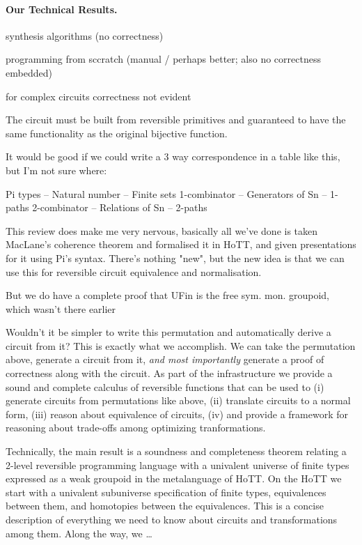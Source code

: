 \paragraph*{Our Technical Results.}



synthesis algorithms (no correctness)

programming from sccratch (manual / perhaps better; also no correctness embedded)

for complex circuits correctness not evident


The circuit must be built from reversible primitives and guaranteed to have the same functionality as the original bijective function.

It would be good if we could write a 3 way correspondence in a table like this, but I'm not sure where:

Pi types -- Natural number -- Finite sets
1-combinator -- Generators of Sn -- 1-paths
2-combinator -- Relations of Sn -- 2-paths

This review does make me very nervous, basically all we've done is taken MacLane's coherence theorem and formalised it in HoTT, and given presentations for it using Pi's syntax. There's nothing "new", but the new idea is that we can use this for reversible circuit equivalence and normalisation.

But we do have a complete proof that UFin is the free sym. mon. groupoid, which wasn't there earlier

Wouldn't it be simpler to write this permutation and automatically derive a circuit from it? This is exactly what we accomplish. We can take the permutation above, generate a circuit from it, \emph{and most importantly} generate a proof of correctness along with the circuit. As part of the infrastructure we provide a sound and complete calculus of reversible functions that can be used to (i) generate circuits from permutations like above, (ii) translate circuits to a normal form, (iii) reason about equivalence of circuits, (iv) and provide a framework for reasoning about trade-offs among optimizing tranformations.

Technically, the main result is a soundness and completeness theorem relating a 2-level reversible programming language with a univalent universe of finite types expressed as a weak groupoid in the metalanguage of HoTT. On the HoTT we start with a univalent subuniverse specification of finite types, equivalences between them, and homotopies between the equivalences. This is a concise description of everything we need to know about circuits and transformations among them. Along the way, we \ldots {}


